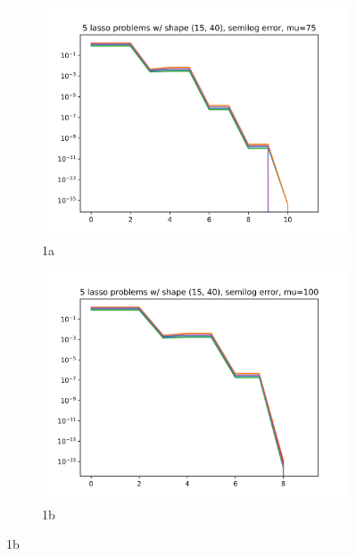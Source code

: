 \documentclass{article}
\begin{document}
{\begin{figure}
\begin{subfigure}{.5\textwidth}
  \centering
  \includegraphics[width=.8\linewidth]{lasso_qp_75.png}
  \caption{1a}
  \label{fig:sfig1}
\end{subfigure}%
\begin{subfigure}{.5\textwidth}
  \centering
  \includegraphics[width=.8\linewidth]{lasso_qp_100.png}
  \caption{1b}
  \label{fig:sfig2}
\end{subfigure}


\end{figure}}
\end{document}
